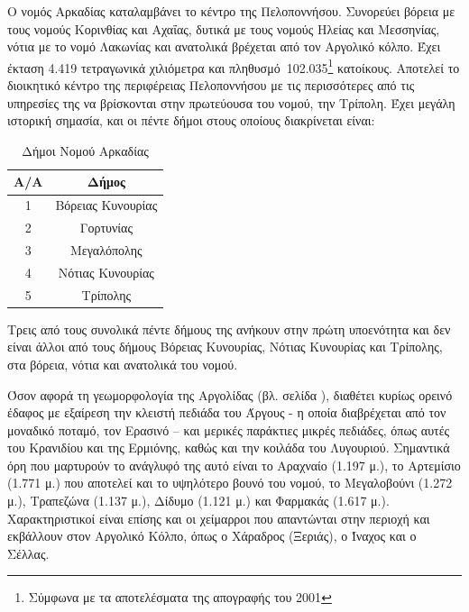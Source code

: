 \documentclass[12pt]{article}
\begin{document}
	Ο νομός Αρκαδίας καταλαμβάνει το κέντρο της Πελοποννήσου. Συνορεύει βόρεια με τους νομούς Κορινθίας και Αχαΐας, δυτικά με τους νομούς Ηλείας και Μεσσηνίας, νότια με το νομό Λακωνίας και ανατολικά βρέχεται από τον Αργολικό κόλπο. Έχει έκταση 4.419 τετραγωνικά χιλιόμετρα και πληθυσμό 102.035\footnote{Σύμφωνα με τα αποτελέσματα της απογραφής του 2001} κατοίκους. Αποτελεί το διοικητικό κέντρο της περιφέρειας Πελοποννήσου με τις περισσότερες από τις υπηρεσίες της να βρίσκονται στην πρωτεύουσα του νομού, την Τρίπολη. Έχει μεγάλη ιστορική σημασία, και οι πέντε δήμοι στους οποίους διακρίνεται είναι:
	
	\begin{table}[H]
		\centering
		\label{my-label}
		\begin{tabular}{|c|c|}
			\hline
			\textbf{A/A} & \textbf{Δήμος}    \\ \hline
			1            & Βόρειας Κυνουρίας  \\ \hline
			2            & Γορτυνίας          \\ \hline
			3          	 & Μεγαλόπολης        \\ \hline
			4            & Νότιας Κυνουρίας   \\  \hline
			5			 & Τρίπολης \\ \hline
		\end{tabular}
		\caption{Δήμοι Νομού Αρκαδίας}
	\end{table}
	
	Τρεις από τους συνολικά πέντε δήμους της ανήκουν στην πρώτη υποενότητα και δεν είναι άλλοι από τους δήμους Βόρειας Κυνουρίας, Νότιας Κυνουρίας και Τρίπολης, στα βόρεια, νότια και ανατολικά του νομού.
	
	Όσον αφορά τη γεωμορφολογία της Αργολίδας (βλ. σελίδα \pageref{peloponnese}), διαθέτει κυρίως ορεινό έδαφος με εξαίρεση την κλειστή πεδιάδα του Άργους - η οποία διαβρέχεται από τον μοναδικό ποταμό, τον Ερασινό – και μερικές παράκτιες μικρές πεδιάδες, όπως αυτές του Κρανιδίου και της Ερμιόνης, καθώς και την κοιλάδα του Λυγουριού. Σημαντικά όρη που μαρτυρούν το ανάγλυφό της αυτό είναι το Αραχναίο (1.197 μ.), το Αρτεμίσιο (1.771 μ.) που αποτελεί και το υψηλότερο βουνό του νομού, το Μεγαλοβούνι (1.272 μ.), Τραπεζώνα (1.137 μ.), Δίδυμο (1.121 μ.) και Φαρμακάς (1.617 μ.). Χαρακτηριστικοί είναι επίσης και οι χείμαρροι που απαντώνται στην περιοχή και εκβάλλουν στον Αργολικό Κόλπο, όπως ο Χάραδρος (Ξεριάς), ο Ίναχος και ο Σέλλας.
	
\end{document}
